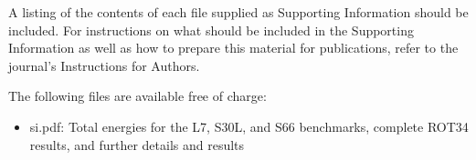 \documentclass[journal=jctcce,manuscript=article]{achemso}
\begin{document}
\begin{suppinfo}

A listing of the contents of each file supplied as Supporting Information
should be included. For instructions on what should be included in the
Supporting Information as well as how to prepare this material for
publications, refer to the journal's Instructions for Authors.

The following files are available free of charge:
\begin{itemize}
\item si.pdf: Total energies for the L7, S30L, and S66 benchmarks,
  complete ROT34 results, and further details and results
\end{itemize}

\end{suppinfo}


\end{document}
